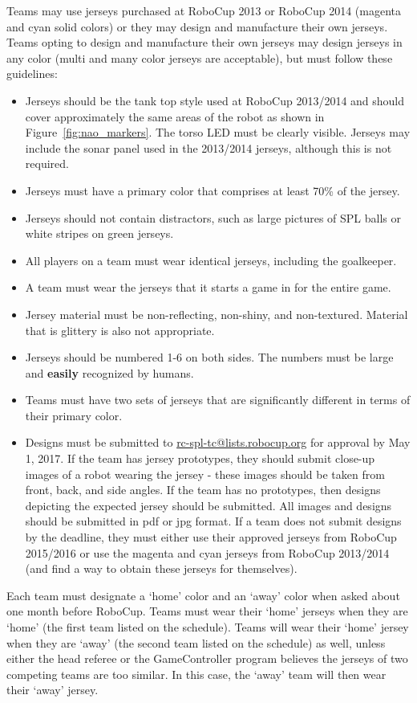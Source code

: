 \documentclass[12pt]{article}
\begin{document}
Teams may use jerseys purchased at RoboCup 2013 or RoboCup 2014 (magenta and cyan solid colors) or they may design and manufacture their own jerseys.  Teams opting to design and manufacture their own jerseys may design jerseys in any color (multi and many color jerseys are acceptable), but must follow these guidelines:
\begin{itemize}
\item Jerseys should be the tank top style used at RoboCup 2013/2014 and should cover approximately the same areas of the robot as shown in Figure~\ref{fig:nao_markers}.  The torso LED must be clearly visible.  Jerseys may include the sonar panel used in the 2013/2014 jerseys, although this is not required.
\item Jerseys must have a primary color that comprises at least 70\% of the jersey.
\item Jerseys should not contain distractors, such as large pictures of SPL balls or white stripes on green jerseys.
\item All players on a team must wear identical jerseys, including the goalkeeper.
\item A team must wear the jerseys that it starts a game in for the entire game.
\item Jersey material must be non-reflecting, non-shiny, and non-textured.  Material that is glittery is also not appropriate.
\item Jerseys should be numbered 1-6 on both sides.  The numbers must be large and {\bf easily} recognized by humans.
\item Teams must have two sets of jerseys that are significantly different in terms of their primary color.
\item Designs must be submitted to \url{rc-spl-tc@lists.robocup.org} for approval by May 1, 2017. If the team has jersey prototypes, they should submit close-up images of a robot wearing the jersey - these images should be taken from front, back, and side angles.  If the team has no prototypes, then designs depicting the expected jersey should be submitted.  All images and designs should be submitted in pdf or jpg format.  If a team does not submit designs by the deadline, they must either use their approved jerseys from RoboCup 2015/2016 or use the magenta and cyan jerseys from RoboCup 2013/2014 (and find a way to obtain these jerseys for themselves).
\end{itemize}

Each team must designate a `home' color and an `away' color when asked about one month before RoboCup.  Teams must wear their `home' jerseys when they are `home' (the first team listed on the schedule).  Teams will wear their `home' jersey when they are `away' (the second team listed on the schedule) as well, unless either the head referee or the GameController program believes the jerseys of two competing teams are too similar.  In this case, the `away' team will then wear their `away' jersey.
\end{document}
